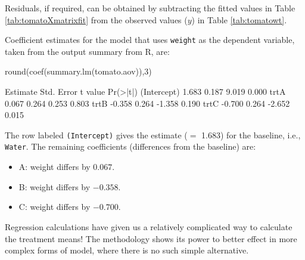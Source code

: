 \documentclass{tufte-book}\usepackage[]{graphicx}\usepackage[]{color}
\newcommand{\txtt}[1]{\texttt{#1}}
\begin{document}
Residuals, if required, can be obtained by subtracting the
fitted values in Table \ref{tab:tomatoXmatrixfit} from the observed
values ($y$) in Table \ref{tab:tomatowt}.

Coefficient estimates for the model that uses \txtt{weight} as the
dependent variable, taken from the output summary from R, are:

\begin{Schunk}
\begin{Sinput}
round(coef(summary.lm(tomato.aov)),3)
\end{Sinput}
\begin{Soutput}
            Estimate Std. Error t value Pr(>|t|)
(Intercept)    1.683      0.187   9.019    0.000
trtA           0.067      0.264   0.253    0.803
trtB          -0.358      0.264  -1.358    0.190
trtC          -0.700      0.264  -2.652    0.015
\end{Soutput}
\end{Schunk}

The row labeled \verb!(Intercept)! gives the estimate ($=$ 1.683) for
the baseline, i.e., \verb!Water!.  The remaining coefficients
(differences from the baseline) are:\vspace*{-2pt}
\begin{itemize}
\leftskip-1.3pt
\item[ ]A: weight differs by $0.067$.
\item[ ]B: weight differs by $-0.358$.
\item[ ]C: weight differs by $-0.700$.
\vspace*{-2pt}
\end{itemize}%
Regression calculations have given
us a relatively complicated way to calculate the treatment means!
The methodology shows its power to better effect in more complex
forms of model, where there is no such simple alternative.
\end{document}
